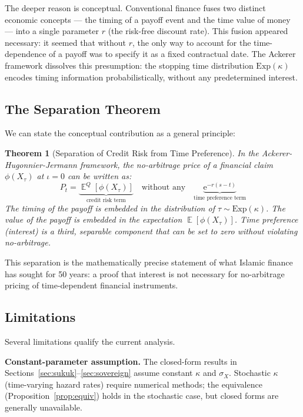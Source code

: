 \documentclass[10pt,twocolumn]{article}
\theoremstyle{plain}
\newtheorem{theorem}{Theorem}
\theoremstyle{definition}
\DeclareMathOperator{\E}{\mathbb{E}}
\begin{document}
The deeper reason is conceptual. Conventional finance fuses two
distinct economic concepts --- the timing of a payoff event and
the time value of money --- into a single parameter $r$ (the
risk-free discount rate). This fusion appeared necessary: it
seemed that without $r$, the only way to account for the
time-dependence of a payoff was to specify it as a fixed
contractual date. The Ackerer framework dissolves this
presumption: the stopping time distribution $\mathrm{Exp}(\kappa)$
encodes timing information probabilistically, without any
predetermined interest.

\subsection{The Separation Theorem}

We can state the conceptual contribution as a general principle:

\begin{theorem}[Separation of Credit Risk from Time Preference]
\label{thm:separation}
In the Ackerer-Hugonnier-Jermann framework, the no-arbitrage
price of a financial claim $\phi(X_\tau)$ at $\iota = 0$ can
be written as:
\begin{equation}
P_t = \underbrace{\E^Q[\phi(X_\tau)]}_{\text{credit risk term}}
\quad\text{without any}\quad
\underbrace{\mathrm{e}^{-r(s-t)}}_{\text{time preference term}}
\label{eq:separation}
\end{equation}
The timing of the payoff is embedded in the distribution of
$\tau \sim \mathrm{Exp}(\kappa)$. The value of the payoff is
embedded in the expectation $\E[\phi(X_\tau)]$. Time preference
(interest) is a third, separable component that can be set to
zero without violating no-arbitrage.
\end{theorem}

This separation is the mathematically precise statement of what
Islamic finance has sought for 50 years: a proof that interest
is not necessary for no-arbitrage pricing of time-dependent
financial instruments.

\subsection{Limitations}

Several limitations qualify the current analysis.

\textbf{Constant-parameter assumption.} The closed-form results
in Sections~\ref{sec:sukuk}--\ref{sec:sovereign} assume constant
$\kappa$ and $\sigma_X$. Stochastic $\kappa$ (time-varying
hazard rates) require numerical methods; the equivalence
(Proposition~\ref{prop:equiv}) holds in the stochastic case,
but closed forms are generally unavailable.
\end{document}
